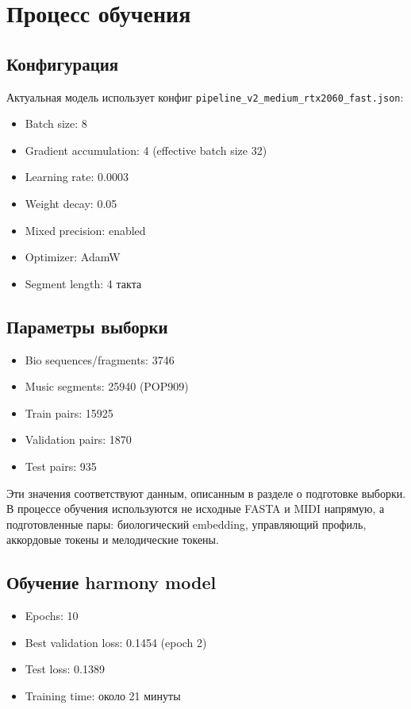\section{Процесс обучения}

\subsection{Конфигурация}

Актуальная модель использует конфиг \texttt{pipeline\_v2\_medium\_rtx2060\_fast.json}:
\begin{itemize}
\item Batch size: 8
\item Gradient accumulation: 4 (effective batch size 32)
\item Learning rate: 0.0003
\item Weight decay: 0.05
\item Mixed precision: enabled
\item Optimizer: AdamW
\item Segment length: 4 такта
\end{itemize}

\subsection{Параметры выборки}

\begin{itemize}
\item Bio sequences/fragments: 3746
\item Music segments: 25940 (POP909)
\item Train pairs: 15925
\item Validation pairs: 1870
\item Test pairs: 935
\end{itemize}

Эти значения соответствуют данным, описанным в разделе о подготовке выборки. В процессе обучения используются не исходные FASTA и MIDI напрямую, а подготовленные пары: биологический embedding, управляющий профиль, аккордовые токены и мелодические токены.

\subsection{Обучение harmony model}

\begin{itemize}
\item Epochs: 10
\item Best validation loss: 0.1454 (epoch 2)
\item Test loss: 0.1389
\item Training time: около 21 минуты
\end{itemize}

